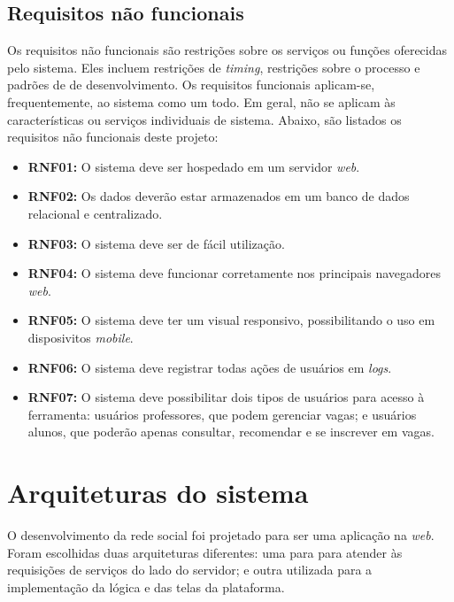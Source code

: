 \subsection{Requisitos não funcionais}
\label{requisitosRNF}
Os requisitos não funcionais são restrições sobre os serviços ou funções oferecidas pelo sistema. Eles incluem restrições de \textit{timing}, restrições sobre o processo e padrões de de desenvolvimento. Os requisitos funcionais aplicam-se, frequentemente, ao sistema como um todo. Em geral, não se aplicam às características ou serviços individuais de sistema. Abaixo, são listados os requisitos não funcionais deste projeto:  

\begin{itemize}
    \item \textbf{RNF01:} O sistema deve ser hospedado em um servidor \textit{web}.

    \item \textbf{RNF02:} Os dados deverão estar armazenados em um banco de dados relacional e centralizado.  

    \item \textbf{RNF03:} O sistema deve ser de fácil utilização.  

    \item \textbf{RNF04:} O sistema deve funcionar corretamente nos principais navegadores \textit{web}.

    \item \textbf{RNF05:} O sistema deve ter um visual responsivo, possibilitando o uso em disposivitos \textit{mobile}.
    
    \item \textbf{RNF06:} O sistema deve registrar todas ações de usuários em \textit{logs}.

    \item \textbf{RNF07:} O sistema deve possibilitar dois tipos de usuários para acesso à ferramenta: usuários professores, que podem gerenciar vagas; e usuários alunos, que poderão apenas consultar, recomendar e se inscrever em vagas.
\end{itemize}

\section{Arquiteturas do sistema}
\label{arquiteturaSistema}
O desenvolvimento da rede social foi projetado para ser uma aplicação na \textit{web}. Foram escolhidas duas arquiteturas diferentes: uma para para atender às requisições de serviços do lado do servidor; e outra utilizada para a implementação da lógica e das telas da plataforma.

